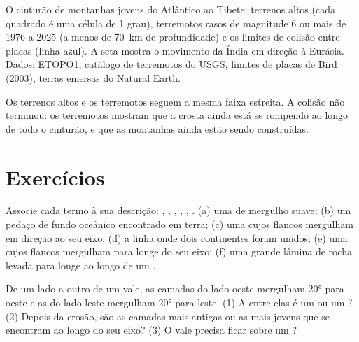 \begin{omfigure}
{\small O cinturão de montanhas jovens do Atlântico ao Tibete: terrenos altos
(cada quadrado é uma célula de 1 grau), terremotos rasos de magnitude 6 ou
mais de 1976 a 2025 (a menos de \qty{70}{km} de profundidade) e os limites
de colisão entre placas (linha azul). A seta mostra o movimento da Índia em
direção à Eurásia. Dados: ETOPO1, catálogo de terremotos do USGS, limites de
placas de Bird (2003), terras emersas do Natural Earth.}
\end{omfigure}

Os terrenos altos e os terremotos seguem a mesma faixa estreita. A colisão
não terminou: os terremotos mostram que a crosta ainda está se rompendo ao
longo de todo o cinturão, e que as montanhas ainda estão sendo construídas.

\section{Exercícios}

\begin{exercise}[$\star$]\label{exo:g12:mountain-building:1}
Associe cada termo à sua descrição: , , ,
, , . (a) uma  de mergulho suave; (b) um
pedaço de fundo oceânico encontrado em terra; (c) uma  cujos flancos
mergulham em direção ao seu eixo; (d) a linha onde dois continentes foram
unidos; (e) uma  cujos flancos mergulham para longe do seu eixo; (f)
uma grande lâmina de rocha levada para longe ao longo de um .
\end{exercise}

\begin{exercise}[$\star$]\label{exo:g12:mountain-building:2}
De um lado a outro de um vale, as camadas do lado oeste mergulham \ang{20}
para oeste e as do lado leste mergulham \ang{20} para leste. (1) A 
entre elas é um  ou um ? (2) Depois da erosão, são as
camadas mais antigas ou as mais jovens que se encontram ao longo do seu
eixo? (3) O vale precisa ficar sobre um ?
\end{exercise}


